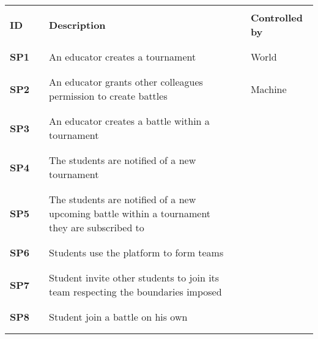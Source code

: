 \renewcommand{\arraystretch}{0.5} 
\begin{longtable}[H]{l l p{8.5cm} l l}
    \hline 
                      & & & & \\
        \textbf{ID}   & \vline & \textbf{Description} & \vline & \textbf{Controlled by} \\   
                      & & & & \\\hline & & & & \\
        \textbf{SP1}  & \vline & An educator creates a tournament & \vline & World \\
                      & & & & \\\hline & & & & \\
        \textbf{SP2}  & \vline & An educator grants other colleagues permission to create battles & \vline & Machine\\
                      & & & & \\\hline & & & & \\
        \textbf{SP3}  & \vline & An educator creates a battle within a tournament & \vline & \\
                      & & & & \\\hline & & & & \\
        \textbf{SP4}  & \vline & The students are notified of a new tournament & \vline & \\
                      & & & & \\\hline & & & & \\
        \textbf{SP5}  & \vline & The students are notified of a new upcoming battle within a tournament they are subscribed to & \vline & \\
                      & & & & \\\hline & & & & \\
        \textbf{SP6}  & \vline & Students use the platform to form teams & \vline & \\
                      & & & & \\\hline & & & & \\
        \textbf{SP7}  & \vline & Student invite other students to join its team respecting the boundaries imposed & \vline & \\
                      & & & & \\\hline & & & & \\
        \textbf{SP8}  & \vline & Student join a battle on his own & \vline & \\
                      & & & & \\\hline & & & & \\

\end{longtable}
